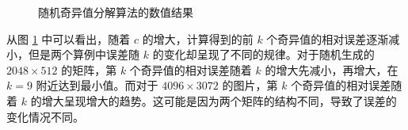\documentclass{article}
\begin{document}
\begin{figure}[ht]
    \centering
    \caption{随机奇异值分解算法的数值结果}
    \label{fig:svd_result}
\end{figure}

从图 \ref{fig:svd_result} 中可以看出，随着 $c$ 的增大，计算得到的前 $k$
个奇异值的相对误差逐渐减小，但是两个算例中误差随 $k$ 的变化却呈现了不同的规律。对于随机生成的 $2048\times 512$
的矩阵，第 $k$ 个奇异值的相对误差随着 $k$ 的增大先减小，再增大，在 $k=9$ 附近达到最小值。而对于 $4096\times
3072$ 的图片，第 $k$ 个奇异值的相对误差随着 $k$ 的增大呈现增大的趋势。这可能是因为两个矩阵的结构不同，导致了误差的变化情况不同。
\end{document}
